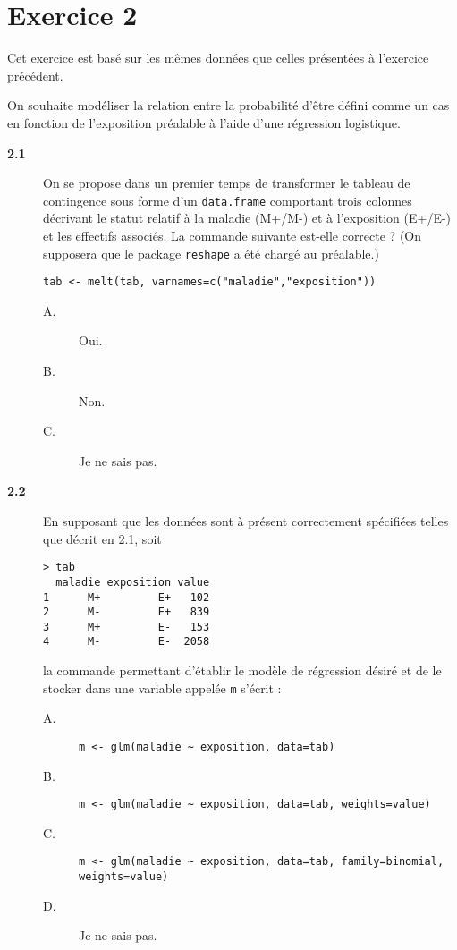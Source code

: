 \documentclass[11pt]{report}
\theoremstyle{definition}
\begin{document}
\section*{Exercice 2}
Cet exercice est basé sur les mêmes données que celles présentées à
l'exercice précédent.

On souhaite modéliser la relation entre la probabilité d'être défini comme
un cas en fonction de l'exposition préalable à l'aide d'une régression
logistique.
  
\begin{description}
\item[\bf 2.1]  On se propose dans un premier temps
  de transformer le tableau de contingence sous forme d'un
  \texttt{data.frame} comportant trois colonnes décrivant le statut relatif
  à la maladie (M+/M-) et à l'exposition (E+/E-) et les effectifs
  associés. La commande suivante est-elle correcte ? (On supposera que le
  package \texttt{reshape} a été chargé au préalable.)
\begin{verbatim}
tab <- melt(tab, varnames=c("maladie","exposition"))
\end{verbatim}
  \begin{description}
  \item[A.] Oui.
  \item[B.] Non.
  \item[C.] Je ne sais pas.
  \end{description}
\item[\bf 2.2]  En supposant que les données sont à
  présent correctement spécifiées telles que décrit en 2.1, soit
\begin{verbatim}
> tab
  maladie exposition value
1      M+         E+   102
2      M-         E+   839
3      M+         E-   153
4      M-         E-  2058
\end{verbatim}
  la commande permettant d'établir le modèle de régression désiré et de le
  stocker dans une variable appelée \texttt{m} s'écrit :
  \begin{description}
  \item[A.] \verb|m <- glm(maladie ~ exposition, data=tab)|
  \item[B.] \verb|m <- glm(maladie ~ exposition, data=tab, weights=value)|
  \item[C.] \verb|m <- glm(maladie ~ exposition, data=tab, family=binomial, weights=value)|
  \item[D.] Je ne sais pas.
  \end{description}

\end{description}
\end{document}
